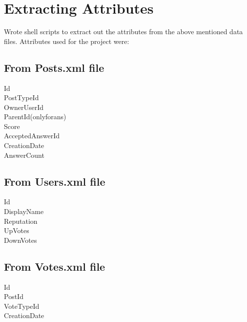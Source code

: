 \documentclass{article}
\begin{document}
\section{Extracting Attributes}
Wrote shell scripts to extract out the attributes from the above mentioned data files. Attributes used for the project were:
\subsection{From Posts.xml file}
Id\\
PostTypeId\\
OwnerUserId\\
ParentId(onlyforans)\\
Score\\
AcceptedAnswerId\\
CreationDate\\
AnswerCount\\
\subsection{From Users.xml file}
Id\\
DisplayName\\
Reputation\\
UpVotes\\
DownVotes\\
\subsection{From Votes.xml file}
Id\\
PostId\\
VoteTypeId\\
CreationDate\\
\end{document}
